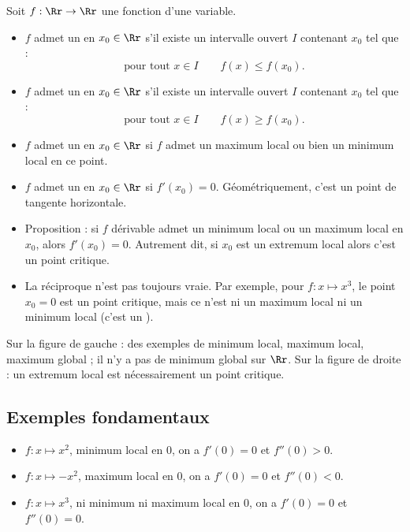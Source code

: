 Soit $f : \Rr \to \Rr$ une fonction d'une variable.
\begin{itemize}
	\item $f$ admet un  en $x_0 \in \Rr$ s'il existe un intervalle ouvert $I$ contenant $x_0$ tel que :
	$$\text{pour tout } x \in I \qquad f(x) \le f(x_0).$$
	
	\item $f$ admet un  en $x_0 \in \Rr$ s'il existe un intervalle ouvert $I$ contenant $x_0$ tel que :
	$$\text{pour tout } x \in I \qquad f(x) \ge f(x_0).$$ 
	
	\item $f$ admet un  en $x_0 \in \Rr$ si $f$ admet un maximum local ou bien un minimum local en ce point.
	\item $f$ admet un  en $x_0 \in \Rr$ si $f'(x_0)=0$. Géométriquement, c'est un point de tangente horizontale.
	
	\item Proposition : si $f$ dérivable admet un minimum local ou un maximum local en $x_0$, alors $f'(x_0)=0$.
	Autrement dit, si $x_0$ est un extremum local alors c'est un point critique.
	
	\item La réciproque n'est pas toujours vraie. Par exemple, pour $f: x \mapsto x^3$, le point $x_0=0$ est un point critique, mais ce n'est ni un maximum local ni un minimum local (c'est un ).
	
	
\end{itemize}


Sur la figure de gauche : des exemples de minimum local, maximum local, maximum global ; il n'y a pas de minimum global sur $\Rr$. Sur la figure de droite : un extremum local est nécessairement un point critique.

\subsection{Exemples fondamentaux}

\begin{itemize}
	\item $f : x \mapsto x^2$, minimum local en $0$, on a $f'(0)=0$ et $f''(0)>0$.
	\item $f : x \mapsto -x^2$, maximum local en $0$, on a $f'(0)=0$ et $f''(0)<0$.
	\item $f : x \mapsto x^3$, ni minimum ni maximum local en $0$, on a $f'(0)=0$ et $f''(0)=0$.      
\end{itemize}

